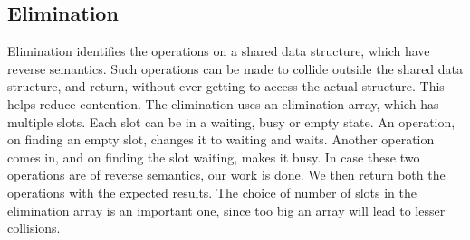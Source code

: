 \subsection{Elimination}
Elimination identifies the operations on a shared data structure, which have reverse semantics. Such operations can be made to collide outside the shared data structure, and return, without ever getting to access the actual structure. This helps  reduce contention. 
The elimination uses an elimination array, which has multiple slots. Each slot can be in a waiting, busy or empty state. An operation, on finding an empty slot, changes it to waiting and waits. Another operation comes in, and on finding the slot waiting, makes it busy. In case these two operations are of reverse semantics, our work is done. We then return both the operations with the expected results. The choice of number of slots in the elimination array is an important one, since too big an array will lead to lesser collisions.


